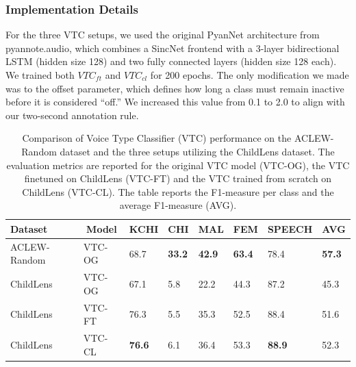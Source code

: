 \documentclass[
  man,floatsintext]{apa6}
\begin{document}
\subsubsection{Implementation Details}\label{implementation-details-1}

For the three VTC setups, we used the original PyanNet architecture from pyannote.audio, which combines a SincNet frontend with a 3-layer bidirectional LSTM (hidden size 128) and two fully connected layers (hidden size 128 each). We trained both \(VTC_{ft}\) and \(VTC_{cl}\) for 200 epochs. The only modification we made was to the offset parameter, which defines how long a class must remain inactive before it is considered ``off.'' We increased this value from 0.1 to 2.0 to align with our two-second annotation rule.

\begin{table}[tbp]

\begin{center}
\begin{threeparttable}

\caption{\label{tab:vtc-results}Comparison of Voice Type Classifier (VTC) performance on the ACLEW-Random dataset and the three setups utilizing the ChildLens dataset. The evaluation metrics are reported for the original VTC model (VTC-OG), the VTC finetuned on ChildLens (VTC-FT) and the VTC trained from scratch on ChildLens (VTC-CL). The table reports the F1-measure per class and the average F1-measure (AVG).}

\begin{tabular}{llllllll}
\toprule
Dataset & \multicolumn{1}{c}{Model} & \multicolumn{1}{c}{KCHI} & \multicolumn{1}{c}{CHI} & \multicolumn{1}{c}{MAL} & \multicolumn{1}{c}{FEM} & \multicolumn{1}{c}{SPEECH} & \multicolumn{1}{c}{AVG}\\
\midrule
ACLEW-Random & VTC-OG & 68.7 & \textbf{33.2} & \textbf{42.9} & \textbf{63.4} & 78.4 & \textbf{57.3}\\
ChildLens & VTC-OG & 67.1 & 5.8 & 22.2 & 44.3 & 87.2 & 45.3\\
ChildLens & VTC-FT & 76.3 & 5.5 & 35.3 & 52.5 & 88.4 & 51.6\\
ChildLens & VTC-CL & \textbf{76.6} & 6.1 & 36.4 & 53.3 & \textbf{88.9} & 52.3\\
\bottomrule
\end{tabular}

\end{threeparttable}
\end{center}

\end{table}
\end{document}
